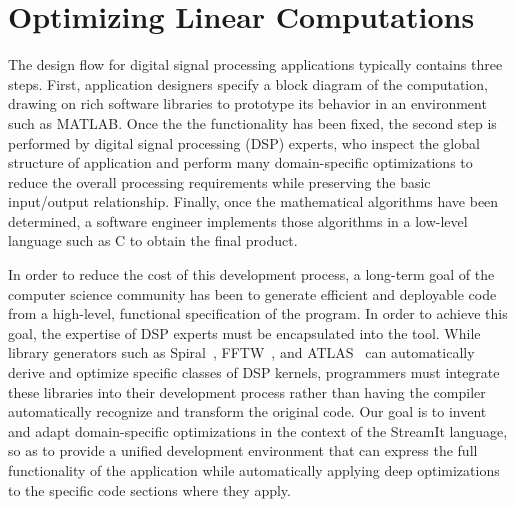 


\section{Optimizing Linear Computations}

The design flow for digital signal processing applications typically
contains three steps.  First, application designers specify a block
diagram of the computation, drawing on rich software libraries to
prototype its behavior in an environment such as MATLAB.  Once the the
functionality has been fixed, the second step is performed by digital
signal processing (DSP) experts, who inspect the global structure of
application and perform many domain-specific optimizations to reduce
the overall processing requirements while preserving the basic
input/output relationship.  Finally, once the mathematical algorithms
have been determined, a software engineer implements those algorithms
in a low-level language such as C to obtain the final product.

In order to reduce the cost of this development process, a long-term
goal of the computer science community has been to generate efficient
and deployable code from a high-level, functional specification of the
program.  In order to achieve this goal, the expertise of DSP experts
must be encapsulated into the tool.  While library generators such as
Spiral~\cite{Spiral-SI}, FFTW~\cite{FFTW-SI}, and
ATLAS~\cite{ATLAS,ATLAS-Sparsity-SI} can automatically derive and
optimize specific classes of DSP kernels, programmers must integrate
these libraries into their development process rather than having the
compiler automatically recognize and transform the original code.  Our
goal is to invent and adapt domain-specific optimizations in the
context of the StreamIt language, so as to provide a unified
development environment that can express the full functionality of the
application while automatically applying deep optimizations to the
specific code sections where they apply.

